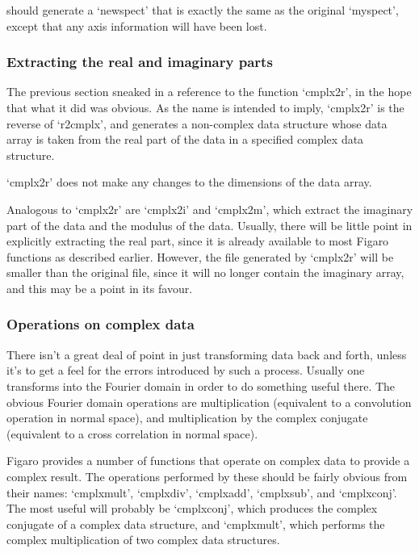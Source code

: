 \documentclass[11pt,twoside]{article}
\begin{document}
   should generate a `newspect' that is exactly the same as the original
   `myspect', except that any axis information will have been lost.


\subsubsection{\label{techno6realimag}Extracting the real and imaginary parts}

   The previous section sneaked in a reference to the function
   `cmplx2r', in the hope that what it did was obvious.  As the name is
   intended to imply, `cmplx2r' is the reverse of `r2cmplx', and
   generates a non-complex data structure whose data array is taken from
   the real part of the data in a specified complex data structure.

   `cmplx2r' does not make any changes to the dimensions of the data
   array.

   Analogous to `cmplx2r' are `cmplx2i' and `cmplx2m', which extract the
   imaginary part of the data and the modulus of the data.  Usually,
   there will be little point in explicitly extracting the real part,
   since it is already available to most Figaro functions as described
   earlier.  However, the file generated by `cmplx2r' will be smaller
   than the original file, since it will no longer contain the imaginary
   array, and this may be a point in its favour.


\subsubsection{\label{techno6oper}Operations on complex data}

   There isn't a great deal of point in just transforming data back and
   forth, unless it's to get a feel for the errors introduced by such a
   process.  Usually one transforms into the Fourier domain in order to
   do something useful there.  The obvious Fourier domain operations are
   multiplication (equivalent to a convolution operation in normal
   space), and multiplication by the complex conjugate (equivalent to a
   cross correlation in normal space).

   Figaro provides a number of functions that operate on complex data to
   provide a complex result.  The operations performed by these should
   be fairly obvious from their names: `cmplxmult', `cmplxdiv',
   `cmplxadd', `cmplxsub', and `cmplxconj'.  The most useful will
   probably be `cmplxconj', which produces the complex conjugate of a
   complex data structure, and `cmplxmult', which performs the complex
   multiplication of two complex data structures.
\end{document}
